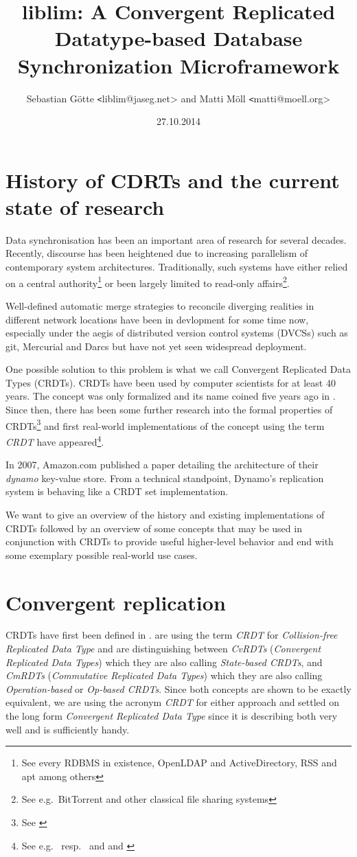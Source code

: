 \documentclass[12pt,a4paper,notitlepage]{article}
\author{Sebastian Götte {\texttt<liblim@jaseg.net>} and Matti Möll {\texttt<matti@moell.org>}}
\title{liblim: A Convergent Replicated Datatype-based Database Synchronization Microframework}
\date{27.10.2014}
\begin{document}
\maketitle

\section{History of CDRTs and the current state of research}
Data synchronisation has been an important area of research for several decades. Recently, discourse has been heightened
due to increasing parallelism of contemporary system architectures. Traditionally, such systems have either relied on a
central authority\footnote{See every RDBMS in existence, OpenLDAP and ActiveDirectory, RSS and apt among others} or been
largely limited to read-only affairs\footnote{See e.g.\ BitTorrent and other classical file sharing systems}.

Well-defined automatic merge strategies to reconcile diverging realities in different network locations have been in
devlopment for some time now, especially under the aegis of distributed version control systems (DVCSs) such as git,
Mercurial and Darcs but have not yet seen widespread deployment.

One possible solution to this problem is what we call Convergent Replicated Data Types (CRDTs). CRDTs have been used by
computer scientists for at least 40 years. The concept was only formalized and its name coined five years ago in
\cite{inria09}. Since then, there has been some further research into the formal properties of CRDTs\footnote{See
\cite{inria11}} and first real-world implementations of the concept using the term \emph{CRDT} have appeared\footnote{See
e.g.\ \cite{riak} resp.\ \cite{riak20-announcement} and \cite{riak-crdt} and \cite{roshi}}.

In 2007, Amazon.com published a paper detailing the architecture of their \emph{dynamo} key-value store. From a technical
standpoint, Dynamo's replication system is behaving like a CRDT set implementation.

We want to give an overview of the history and existing implementations of CRDTs followed by an overview of some
concepts that may be used in conjunction with CRDTs to provide useful higher-level behavior and end with some exemplary
possible real-world use cases.

\section{Convergent replication}
CRDTs have first been defined in \cite{inria09}. \cite{inria09} are using the term \emph{CRDT} for \emph{Collision-free
Replicated Data Type} and are distinguishing between \emph{CvRDTs} (\emph{Convergent Replicated Data Types}) which they are
also calling \emph{State-based CRDTs}, and \emph{CmRDTs} (\emph{Commutative Replicated Data Types}) which they are also
calling \emph{Operation-based} or \emph{Op-based CRDTs}. Since both concepts are shown to be exactly equivalent, we are
using the acronym \emph{CRDT} for either approach and settled on the long form \emph{Convergent Replicated Data Type} since
it is describing both very well and is sufficiently handy.
\end{document}
